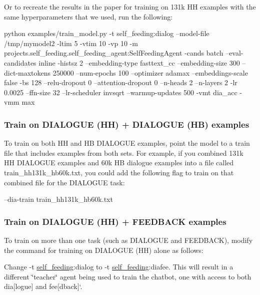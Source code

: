 Or to recreate the results in the paper for training on 131k HH examples with the same hyperparameters that we used, run the following\+:


\begin{DoxyCode}
python examples/train\_model.py -t self\_feeding:dialog --model-file /tmp/mymodel2 -ltim 5 -vtim 10 -vp 10 -m
       projects.self\_feeding.self\_feeding\_agent:SelfFeedingAgent -cands batch --eval-candidates inline -histsz 2
       --embedding-type fasttext\_cc --embedding-size 300 --dict-maxtokens 250000 --num-epochs 100 --optimizer adamax
       --embeddings-scale false -bs 128 --relu-dropout 0 --attention-dropout 0 --n-heads 2 --n-layers 2 -lr 0.0025
       --ffn-size 32 --lr-scheduler invsqrt --warmup-updates 500 -vmt dia\_acc -vmm max
\end{DoxyCode}


\subsubsection*{Train on D\+I\+A\+L\+O\+G\+UE (HH) + D\+I\+A\+L\+O\+G\+UE (HB) examples}

To train on both HH and HB D\+I\+A\+L\+O\+G\+UE examples, point the model to a train file that includes examples from both sets. For example, if you combined 131k HH D\+I\+A\+L\+O\+G\+UE examples and 60k HB dialogue examples into a file called {\ttfamily train\+\_\+hh131k\+\_\+hb60k.\+txt}, you could add the following flag to train on that combined file for the D\+I\+A\+L\+O\+G\+UE task\+:


\begin{DoxyCode}
--dia-train train\_hh131k\_hb60k.txt
\end{DoxyCode}


\subsubsection*{Train on D\+I\+A\+L\+O\+G\+UE (HH) + F\+E\+E\+D\+B\+A\+CK examples}

To train on more than one task (such as D\+I\+A\+L\+O\+G\+UE and F\+E\+E\+D\+B\+A\+CK), modify the command for training on D\+I\+A\+L\+O\+G\+UE (HH) alone as follows\+:


\begin{DoxyItemize}
\item Change {\ttfamily -\/t \hyperlink{namespaceself__feeding}{self\+\_\+feeding}\+:dialog} to {\ttfamily -\/t \hyperlink{namespaceself__feeding}{self\+\_\+feeding}\+:diafee}. This will result in a different \char`\"{}teacher\char`\"{} agent being used to train the chatbot, one with access to both \textquotesingle{}dia\mbox{[}logue\mbox{]}\textquotesingle{} and \textquotesingle{}fee\mbox{[}dback\mbox{]}`.
\end{DoxyItemize}

